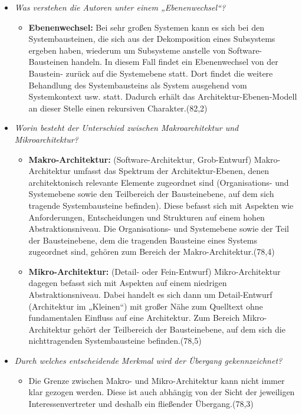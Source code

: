 \begin{enumerate}[(a)]
\begin{itemize}
\begin{itemize}
        \end{itemize}
        
        
        \item {\itshape Was verstehen die Autoren unter einem „Ebenenwechsel“?}
        \begin{itemize}
            \item \textbf{Ebenenwechsel:} Bei sehr großen Systemen kann es sich bei den Systembausteinen, die sich aus der Dekomposition eines Subsystems ergeben haben, wiederum um Subsysteme anstelle von Software-Bausteinen handeln. In diesem Fall findet ein Ebenenwechsel von der Baustein- zurück auf die Systemebene statt. Dort findet die weitere Behandlung des Systembausteins als System ausgehend vom Systemkontext usw. statt.  Dadurch erhält das Architektur-Ebenen-Modell an dieser Stelle einen rekursiven Charakter.(82,2)
        \end{itemize}
        
        \item {\itshape {Worin besteht der Unterschied zwischen Makroarchitektur und Mikroarchitektur?}}
        \begin{itemize}
            \item \textbf{Makro-Architektur:} (Software-Architektur, Grob-Entwurf) Makro-Architektur umfasst das Spektrum der Architektur-Ebenen, denen architektonisch relevante Elemente zugeordnet sind (Organisations- und Systemebene sowie den Teilbereich der Bausteinebene, auf dem sich tragende Systembausteine befinden). Diese befasst sich mit Aspekten wie Anforderungen, Entscheidungen und Strukturen auf einem hohen Abstraktionsniveau. Die Organisations- und Systemebene sowie der Teil der Bausteinebene, dem die tragenden Bausteine eines Systems zugeordnet sind, gehören zum Bereich der Makro-Architektur.(78,4)
            
            \item \textbf{Mikro-Architektur:} (Detail- oder Fein-Entwurf) Mikro-Architektur dagegen befasst sich mit Aspekten auf einem niedrigen Abstraktionsniveau. Dabei handelt es sich dann um Detail-Entwurf (Architektur im „Kleinen“) mit großer Nähe zum Quelltext ohne fundamentalen Einfluss auf eine Architektur. Zum Bereich Mikro-Architektur gehört der Teilbereich der Bausteinebene, auf dem sich die nichttragenden Systembausteine befinden.(78,5)
        \end{itemize}
        
        \item {\itshape Durch welches entscheidende Merkmal wird der Übergang gekennzeichnet?}
        \begin{itemize}
            \item Die Grenze zwischen Makro- und Mikro-Architektur kann nicht immer klar gezogen werden. Diese ist auch abhängig von der Sicht der jeweiligen Interessenvertreter und deshalb ein fließender Übergang.(78,3)


\end{itemize}
\end{itemize}
\end{enumerate}
